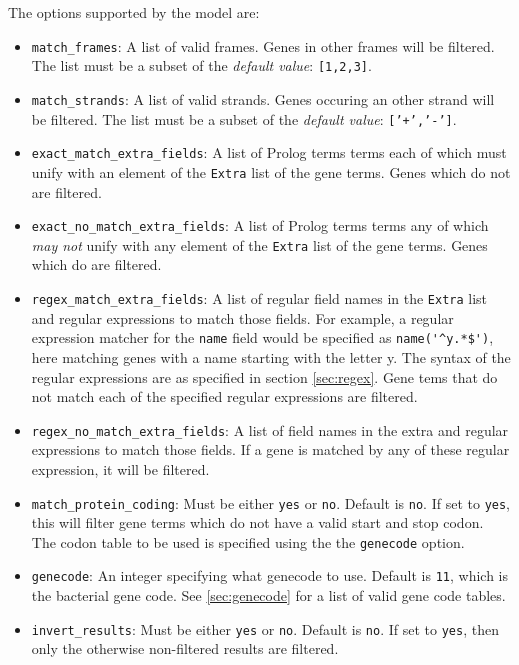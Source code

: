 \documentclass{book}
\begin{document}
The options supported by the model are:
\begin{itemize}
\item \texttt{match\_frames}: A list of valid frames. Genes in other
  frames will be filtered. The list must be a subset of the \emph{default
    value}: \texttt{[1,2,3]}. 
\item \texttt{match\_strands}: A list of valid strands. Genes occuring
  an other strand will be filtered. The list must be a subset of the
  \emph{default value}: \texttt{['+','-']}.
\item \texttt{exact\_match\_extra\_fields}: A list of Prolog terms
  terms each of which must unify with an element of 
the \texttt{Extra} list of the gene terms. Genes which do not are filtered. 
\item  \texttt{exact\_no\_match\_extra\_fields}: A list of Prolog
  terms terms any of which \emph{may not} unify with any element of
  the \texttt{Extra} list of the gene terms. Genes which do are
  filtered.
\item \texttt{regex\_match\_extra\_fields}: A list of regular field
  names in the \texttt{Extra} list and regular expressions to match
  those fields.  For example, a regular expression matcher for the
  \texttt{name} field would be specified as \verb|name('^y.*$')|,
  here matching genes with a name starting with the letter y.
  The syntax of the regular expressions are as specified in section
  \ref{sec:regex}.
  Gene tems that do not match each of the specified regular
  expressions are filtered. 
\item \texttt{regex\_no\_match\_extra\_fields}: A list of field names
  in the extra and regular expressions to match those fields. If a
  gene is matched by any of these regular expression, it will be
  filtered.
\item \texttt{match\_protein\_coding}: Must be either \texttt{yes} or
 \texttt{no}. Default is \texttt{no}. 
If set to \texttt{yes}, this
  will filter gene terms which do not have a valid start and stop
  codon. The codon table to be used is specified using the the
  \texttt{genecode} option.
\item \texttt{genecode}: An integer specifying what genecode to use.
  Default is \texttt{11}, which is the bacterial gene code.  See
  \ref{sec:genecode} for a list of valid gene code tables. 
\item \texttt{invert\_results}: Must be either \texttt{yes} or
 \texttt{no}. Default is \texttt{no}. If set to \texttt{yes}, then
 only the otherwise non-filtered results are filtered.
\end{itemize}
\end{document}
